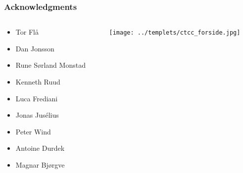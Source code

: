 \begin{frame}
    \frametitle{Acknowledgments}
    \large
    \begin{columns}
    \begin{column}[b]{0.5\linewidth}
    \begin{itemize}
    	\item Tor Fl{\aa}
    	\item Dan Jonsson
    	\item Rune S{\o}rland Monstad
        \item Kenneth Ruud
	\item Luca Frediani
    \end{itemize}

    \vspace{5mm}

    \begin{itemize}
    	\item Jonas Jus{\'e}lius
    	\item Peter Wind
	\item Antoine Durdek
    	\item Magnar Bj{\o}rgve
    \end{itemize}

    \vspace{5mm}

    \end{column}
    \begin{column}[b]{0.5\linewidth}
	\centering
	\texttt{[image: ../templets/ctcc\_forside.jpg]}\\

        \vspace{10mm}


\end{column}
\end{columns}
\end{frame}
